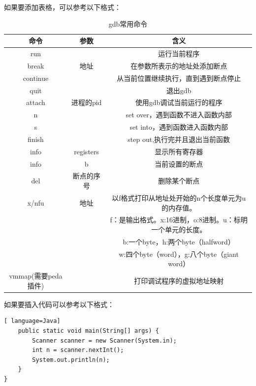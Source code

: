 \documentclass{labart}
\begin{document}
如果要添加表格，可以参考以下格式：

\begin{table}[H]
\centering
\caption{gdb常用命令}
\begin{tabular}{|c|c|c|}
\hline  
命令&参数&含义\\
\hline  
run&&运行当前程序\\
\hline
break& 地址& 在参数所表示的地址处添加断点 \\
\hline 
continue&&从当前位置继续执行，直到遇到断点停止 \\
\hline
quit && 退出gdb \\
\hline
attach & 进程的pid & 使用gdb调试当前运行的程序 \\
\hline
n && set over，遇到函数不进入函数内部 \\
\hline
s && set into，遇到函数进入函数内部 \\
\hline
finish && step out,执行完并且退出当前函数 \\
\hline
info & registers & 显示所有寄存器 \\
\hline
info & b & 当前设置的断点 \\
\hline
del & 断点的序号 & 删除某个断点 \\
\hline 
x/nfu & 地址 & 以f格式打印从地址处开始的n个长度单元为u的内存值。\\
&&f：是输出格式。x:16进制，o:8进制。u：标明一个单元的长度。\\
&&b:一个byte，h:两个byte（halfword）\\
&&w:四个byte（word），g:八个byte（giant word）\\
\hline
vmmap(需要peda插件) && 打印调试程序的虚拟地址映射 \\
\hline
\end{tabular}
\end{table}

如果要插入代码可以参考以下格式：
\begin{lstlisting}[ language=Java]
    public static void main(String[] args) {
	    Scanner scanner = new Scanner(System.in);
	    int n = scanner.nextInt();
	    System.out.println(n);
    }
}
\end{lstlisting}
\end{document}
